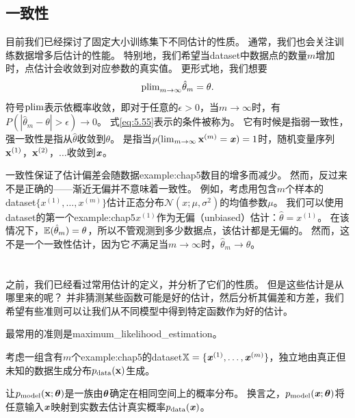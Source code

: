 \subsection{一致性}
\label{sec:consistency}
目前我们已经探讨了固定大小训练集下不同估计的性质。
通常，我们也会关注训练数据增多后估计的性能。
特别地，我们希望当\gls{dataset}中数据点的数量$m$增加时，点估计会收敛到对应参数的真实值。
更形式地，我们想要
\begin{equation}
\label{eq:5.55}
    \text{plim}_{m\to\infty} \hat{\theta}_m = \theta.
\end{equation}
符号$\text{plim}$表示依概率收敛，即对于任意的$\epsilon > 0$，当$m\to\infty$时，有$P(|\hat{\theta}_m - \theta| > \epsilon) \to 0$。
式\ref{eq:5.55}表示的条件被称为。
它有时候是指弱一致性，强一致性是指从$\hat{\theta}$收敛到$\theta$。
是指当$p(\lim_{m\to\infty} \mathbf{x}^{(m)} = \boldsymbol{\mathit{x}}) = 1 $时，随机变量序列$\mathbf{x}^{(1)}$，$\mathbf{x}^{(2)}$，$\dots$收敛到$\boldsymbol{\mathit{x}}$。

一致性保证了估计偏差会随数据\gls{example:chap5}数目的增多而减少。
然而，反过来不是正确的——渐近无偏并不意味着一致性。
例如，考虑用包含$m$个样本的\gls{dataset}$\{x^{(1)},\dots,x^{(m)}\}$估计正态分布$\mathcal{N}(x;\mu,\sigma^2)$的均值参数$\mu$。
我们可以使用\gls{dataset}的第一个\gls{example:chap5}$x^{(1)}$作为无偏（unbiased）估计：$\hat{\theta} = x^{(1)}$。
在该情况下，$\mathbb{E}(\hat{\theta}_m) = \theta$，所以不管观测到多少数据点，该估计都是无偏的。
然而，这不是一个一致性估计，因为它\emph{不}满足当$m\to\infty$时，$\hat{\theta}_m \to \theta$。


\section{}
\label{sec:maximum_likelihood_estimation}
之前，我们已经看过常用估计的定义，并分析了它们的性质。
但是这些估计是从哪里来的呢？
并非猜测某些函数可能是好的估计，然后分析其偏差和方差，我们希望有些准则可以让我们从不同模型中得到特定函数作为好的估计。

最常用的准则是\gls{maximum_likelihood_estimation}。

考虑一组含有$m$个\gls{example:chap5}的\gls{dataset}$\mathbb{X}=\{ \boldsymbol{\mathit{x}}^{(1)},\dots, \boldsymbol{\mathit{x}}^{(m)} \}$，独立地由真正但未知的数据生成分布$p_{\text{data}}(\mathbf{x})$生成。

让$p_{\text{model}}( \mathbf{x}; \boldsymbol{\theta} )$是一族由$\boldsymbol{\theta}$确定在相同空间上的概率分布。
换言之，$p_{\text{model}}(\boldsymbol{\mathit{x}};\boldsymbol{\theta})$将任意输入$\boldsymbol{\mathit{x}}$映射到实数去估计真实概率$p_{\text{data}}(\boldsymbol{\mathit{x}})$。


